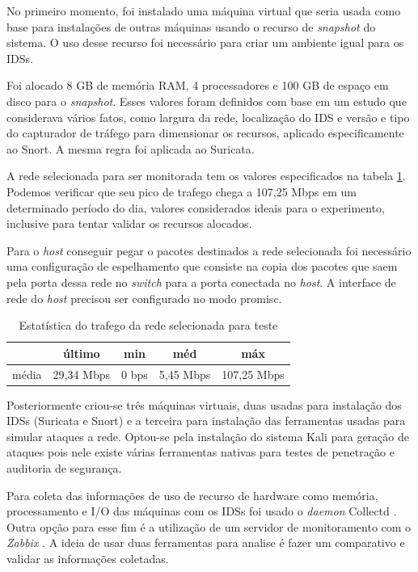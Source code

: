 \documentclass[
	12pt,				%
	openright,			%
	twoside,			%
	a4paper,			%
	english,			%
	brazil				%
	]{abntex2}
\begin{document}
No primeiro momento, foi instalado uma máquina virtual que seria usada como base para instalações de outras máquinas usando o recurso de \textit{snapshot} do sistema. O uso desse recurso foi necessário para criar um ambiente igual para os IDSs.

Foi alocado 8 GB de memória RAM, 4 processadores e 100 GB de espaço em disco para o \textit{snapshot}. Esses valores foram definidos com base em um estudo \cite{mikelococo} que considerava vários fatos, como largura da rede, localização do IDS e versão e tipo do capturador de tráfego para dimensionar os recursos, aplicado especificamente ao Snort. A mesma regra foi aplicada ao Suricata.

A rede selecionada para ser monitorada tem os valores especificados na tabela \ref{tabela-tráfego}. Podemos verificar que seu pico de trafego chega a 107,25 Mbps em um determinado período do dia, valores considerados ideais para o experimento, inclusive para tentar validar os recursos alocados. 

Para o \textit{host} conseguir pegar o pacotes destinados a rede selecionada foi necessário uma configuração de espelhamento que consiste na copia dos pacotes que saem pela porta dessa rede no \textit{switch} para a porta conectada no \textit{host}. A interface de rede do \textit{host} precisou ser configurado no modo promisc.

\begin{table}
 \centering
 \begin{tabular}{|c|c|c|c|c|}
 \hline
  & último & min & méd & máx \\
 \hline
 média & 29,34 Mbps & 0 bps & 5,45 Mbps & 107,25 Mbps \\
 \hline
 \end{tabular}
 \caption{Estatística do trafego da rede selecionada para teste}
 \label{tabela-tráfego}
\end{table}

Posteriormente criou-se três máquinas virtuais, duas usadas para instalação dos IDSs (Suricata e Snort) e a terceira para instalação das ferramentas usadas para simular ataques a rede. Optou-se pela instalação do sistema Kali \cite{kalilinux} para geração de ataques pois nele existe várias ferramentas nativas para testes de penetração e auditoria de segurança.
 
Para coleta das informações de uso de recurso de hardware como memória, processamento e I/O das máquinas com os IDSs foi usado o \textit{daemon} Collectd \cite{collectd}. Outra opção para esse fim é a utilização de um servidor de monitoramento com o \textit{Zabbix} \cite{zabbix}. A ideia de usar duas ferramentas para analise é fazer um comparativo e validar as informações coletadas.
\end{document}
